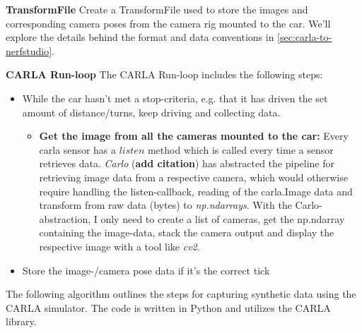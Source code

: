 \textbf{TransformFile}
Create a TransformFile used to store the images and corresponding camera poses from the camera rig mounted to the car. We’ll explore the details behind the format and data conventions in \autoref{sec:carla-to-nerfstudio}.

\textbf{CARLA Run-loop}
The CARLA Run-loop includes the following steps:

\begin{itemize}
    \item While the car hasn’t met a stop-criteria, e.g. that it has driven the set amount of distance/turns, keep driving and collecting data.
    \begin{itemize}
        \item \textbf{Get the image from all the cameras mounted to the car:} Every carla sensor has a $listen$ method which is called every time a sensor retrieves data. \textit{Carlo} (\textbf{add citation}) has abstracted the pipeline for retrieving image data from a respective camera, which would otherwise require handling the listen-callback, reading of the carla.Image data and transform from raw data (bytes) to \textit{np.ndarrays}. With the Carlo-abstraction, I only need to create a list of cameras, get the np.ndarray containing the image-data, stack the camera output and display the respective image with a tool like \textit{cv2}.
    \end{itemize}
    \item Store the image-/camera pose data if it’s the correct tick
\end{itemize}


The following algorithm outlines the steps for capturing synthetic data using the CARLA simulator. The code is written in Python and utilizes the CARLA library.

\begin{comment}
    
\begin{algorithmic}[1]
\Function{run\_carla\_session}{experiment\_settings}
    \State \textbf{create a directory} for the experiment and save experiment settings to a file
    \State \textbf{create a SLURM script} for the experiment
    \State \textbf{spawn an ego vehicle} and set up the traffic manager
    \State \textbf{create cameras} based on the specified camera rigs and rig file
    \State \textbf{create a TransformFile} to store the image and camera pose data
    \While{\textbf{stop criteria has not been met}}
        \State \textbf{tick the CARLA world}
        \State \textbf{get images} from all mounted cameras and stack them horizontally
        \State \textbf{show the image}
        \State \textbf{store the image and camera pose data} every n-th tick
        \State \textbf{update the distance traveled} using euclidean distance
    \EndWhile
    \State \textbf{export the TransformFile} and destroy the actors
\EndFunction
\end{algorithmic}

\end{comment}











